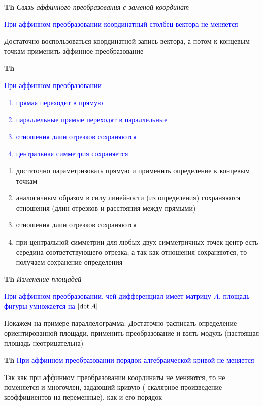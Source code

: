 \documentclass[a4paper, 14pt]{article}
\begin{document}
    \textbf{Th} \textit{Связь аффинного преобразования с заменой координат}

    \textcolor{blue}{При аффинном преобразовании координатный столбец вектора не меняется}

    Достаточно воспользоваться координатной запись вектора, а потом к концевым точкам применить аффинное преобразование

    \textbf{Th} \textcolor{blue}{При аффинном преобразовании
        \begin{enumerate}
            \item прямая переходит в прямую
            \item параллельные прямые переходят в параллельные
            \item отношения длин отрезков сохраняются
            \item центральная симметрия сохраняется
        \end{enumerate}           }

    \begin{enumerate}
        \item достаточно параметризовать прямую и применить определение к концевым точкам
        \item аналогичным образом в силу линейности (из определения) сохраняются отношения (длин отрезков и
        расстояния между прямыми)
        \item отношения длин отрезков сохраняются
        \item при центральной симметрии для любых двух симметричных точек центр есть середина соответствующего
        отрезка, а так как отношения сохраняются, то получаем сохранение определения
    \end{enumerate}

    \textbf{Th} \textit{Изменение площадей}

    \textcolor{blue}{При аффинном преобразовании, чей дифференциал имеет матрицу $A$, площадь фигуры умножается
    на $\abs{\det A}$}

    Покажем на примере параллелограмма.
    Достаточно расписать определение ориентированной площади, применить преобразование и взять модуль (настоящая
    площадь неотрицательна)

    \textbf{Th} \textcolor{blue}{При аффинном преобразовании порядок алгебраической кривой не меняется}

    Так как при аффинном преобразовании координаты не меняются, то не поменяется и многочлен, задающий кривую (
    скалярное произведение коэффициентов на переменные), как и его порядок
\end{document}
